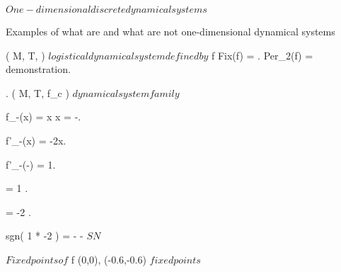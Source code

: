\documentclass[../Main/main]{subfiles}
\begin{document}
\unit{ $ One-dimensional discrete dynamical systems $ }
{
	\introduction
	{ 
		Examples of what are and what are not one-dimensional dynamical systems
	}

	{
		{
			( M, T, \phi ) $ logistical dynamical system defined by $ f
		}
		\holds
		{
			Fix(f) = .
			Per_2(f) = 
		}
		\demonstration
		{
			demonstration.
		}
	}


	{
		{
			.
			( M, T, f_c ) $ dynamical system family $
		}
		{
			f_{-}(x) = x \ifandonlyif x = -.

			f'_{-}(x) = -2x.

			f'_{-}(-) = 1.

			 = 1 .

			 = -2 .

			sgn( 1 * -2 ) = - \imp - $ SN $
		}
	}


	{
		{
		}
		\study
		{
			$Fixed points of $ f
		}
		\demonstration
		{
			(0,0), (-0.6,-0.6) $ fixed points $
		}
	}

}
\end{document}
